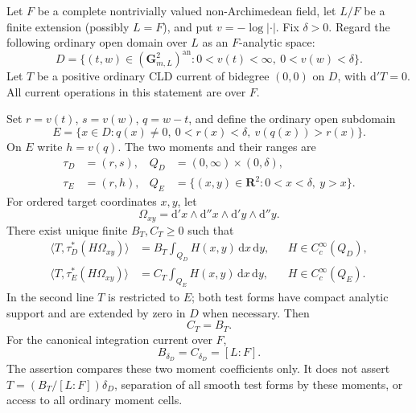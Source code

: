 \begin{proposition}
\label{prop:p213-mixed-branch-transport}
Let \(F\) be a complete nontrivially valued non-Archimedean
field, let \(L/F\) be a finite extension (possibly \(L=F\)),
and put \(v=-\log|\cdot|\). Fix \(\delta>0\).
Regard the following ordinary open domain over \(L\) as an
\(F\)-analytic space:
\[
 D=\{(t,w)\in(\mathbf G_{m,L}^2)^{\mathrm{an}}:
             0<v(t)<\infty,\ 0<v(w)<\delta\}.
\]
Let \(T\) be a positive ordinary CLD current of bidegree
\((0,0)\) on \(D\), with \(\mathrm d'T=0\).
All current operations in this statement are over \(F\).

Set \(r=v(t)\), \(s=v(w)\), \(q=w-t\), and define the
ordinary open subdomain
\[
 E=\{x\in D:q(x)\ne0,\ 0<r(x)<\delta,\ v(q(x))>r(x)\}.
\]
On \(E\) write \(h=v(q)\). The two moments and their ranges are
\[
 \begin{aligned}
 \tau_D&=(r,s),&
 Q_D&=(0,\infty)\times(0,\delta),\\
 \tau_E&=(r,h),&
 Q_E&=\{(x,y)\in\mathbf R^2:0<x<\delta,\ y>x\}.
 \end{aligned}
\]
For ordered target coordinates \(x,y\), let
\[
 \Omega_{xy}=\mathrm d'x\wedge\mathrm d''x\wedge
             \mathrm d'y\wedge\mathrm d''y .
\]
There exist unique finite \(B_T,C_T\geq0\) such that
\begin{align}
 \langle T,\tau_D^*(H\Omega_{xy})\rangle
   &=B_T\int_{Q_D}H(x,y)\,\mathrm dx\,\mathrm dy,
       &&H\in C_c^\infty(Q_D),\label{eq:p213-mixed-old}\\
 \langle T,\tau_E^*(H\Omega_{xy})\rangle
   &=C_T\int_{Q_E}H(x,y)\,\mathrm dx\,\mathrm dy,
       &&H\in C_c^\infty(Q_E).\label{eq:p213-mixed-new}
\end{align}
In the second line \(T\) is restricted to \(E\); both test
forms have compact analytic support and are extended by
zero in \(D\) when necessary. Then
\begin{equation}
 \label{eq:p213-mixed-equality}
                         C_T=B_T .
\end{equation}
For the canonical integration current over \(F\),
\[
                    B_{\delta_D}=C_{\delta_D}=[L:F].
\]
The assertion compares these two moment coefficients only.
It does not assert \(T=(B_T/[L:F])\delta_D\), separation of
all smooth test forms by these moments, or access to all
ordinary moment cells.
\end{proposition}
